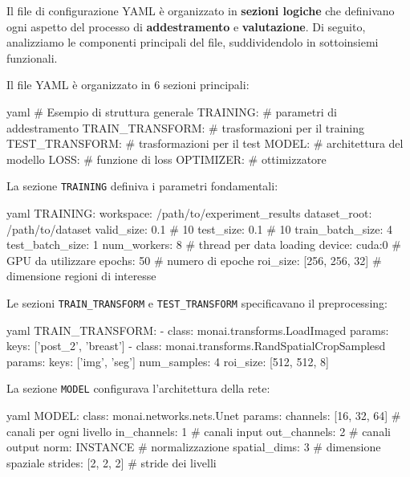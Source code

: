 Il file di configurazione YAML è organizzato in \textbf{sezioni logiche} che definivano ogni aspetto del processo di \textbf{addestramento} e \textbf{valutazione}. Di seguito, analizziamo le componenti principali del file, suddividendolo in sottoinsiemi funzionali.

Il file YAML è organizzato in 6 sezioni principali:

\begin{code}{yaml}
# Esempio di struttura generale
TRAINING:
  # parametri di addestramento
TRAIN_TRANSFORM:
  # trasformazioni per il training
TEST_TRANSFORM:
  # trasformazioni per il test
MODEL:
  # architettura del modello
LOSS:
  # funzione di loss
OPTIMIZER:
  # ottimizzatore
\end{code}

La sezione \texttt{TRAINING} definiva i parametri fondamentali:

\begin{code}{yaml}
TRAINING:
  workspace: /path/to/experiment_results
  dataset_root: /path/to/dataset
  valid_size: 0.1  # 10%
  test_size: 0.1   # 10%
  train_batch_size: 4
  test_batch_size: 1 
  num_workers: 8    # thread per data loading
  device: cuda:0    # GPU da utilizzare
  epochs: 50        # numero di epoche
  roi_size: [256, 256, 32]  # dimensione regioni di interesse
\end{code}


Le sezioni \texttt{TRAIN\_TRANSFORM} e \texttt{TEST\_TRANSFORM} specificavano il preprocessing:

\begin{code}{yaml}
TRAIN_TRANSFORM:
  - class: monai.transforms.LoadImaged
    params:
      keys: ['post_2', 'breast']
  - class: monai.transforms.RandSpatialCropSamplesd
    params:
      keys: ['img', 'seg']
      num_samples: 4
      roi_size: [512, 512, 8]
\end{code}


La sezione \texttt{MODEL} configurava l'architettura della rete:

\begin{code}{yaml}
MODEL:
  class: monai.networks.nets.Unet
  params:
    channels: [16, 32, 64]  # canali per ogni livello
    in_channels: 1          # canali input
    out_channels: 2         # canali output
    norm: INSTANCE          # normalizzazione
    spatial_dims: 3         # dimensione spaziale
    strides: [2, 2, 2]      # stride dei livelli
\end{code}


